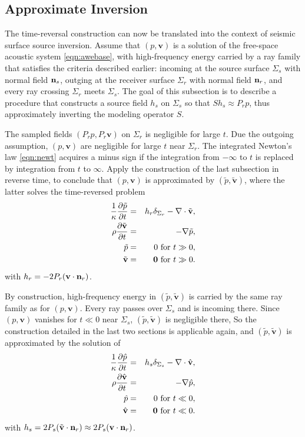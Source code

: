 \documentclass[georeport,12pt]{geophysics}
\newcommand{\bv}{\mathbf{v}}
\begin{document}
\subsection{Approximate Inversion}

The time-reversal construction can now be translated into the context
of seismic surface source inversion. Assume that $(p,\bv)$ is a
solution of the free-space acoustic system \ref{eqn:awebase}, with
high-frequency energy carried by a ray family that satisfies the
criteria described earlier: incoming at the source surface $\Sigma_s$
with normal field ${\bf n}_s$, outging at the receiver surface
$\Sigma_r$ with normal field ${\bf n}_r$, and every ray crossing
$\Sigma_r$ meets $\Sigma_s$. The goal of this subsection is to
describe a procedure that constructs a source field $h_s$ on
$\Sigma_s$ so that $Sh_s \approx P_rp$, thus approximately inverting
the modeling operator $S$.

The sampled fields $(P_rp,P_r\bv)$ on $\Sigma_r$
is negligible for large $t$. Due the outgoing assumption,
$(p,\bv)$ are negligible for large $t$ near $\Sigma_r$. The
integrated Newton's law \ref{eqn:newt} acquires a minus sign if the
integration from $-\infty$ to $t$ is replaced by integration from $t$
to $\infty$. Apply the construction of the last subsection in reverse
time, to conclude
that $(p,\bv)$ is approximated by $(\tilde{p},\tilde{\bv})$, where the
latter solves the time-reversed problem
\begin{eqnarray}
\label{eqn:awerec}
  \frac{1}{\kappa}\frac{\partial\tilde{p}}{\partial t} & = & h_r \delta_{\Sigma_r}
                                                      - \nabla \cdot \tilde{\bv}, \nonumber \\
  \rho\frac{\partial \tilde{\bv}}{\partial t} & = & - \nabla \tilde{p},\\
  \tilde{p} & = & 0 \mbox{ for } t\gg 0, \\
  \tilde{\bv} & = & {\bf 0} \mbox{ for } t \gg 0.       
\end{eqnarray}
with $h_r = -2P_r(\bv \cdot {\bf n}_r)$.

By construction, high-frequency energy in $(\tilde{p},\tilde{\bv})$ is
carried by the same ray family as for $(p,\bv)$. Every ray passes over
$\Sigma_s$ and is incoming there. Since $(p,\bv)$ vanishes for $t \ll
0$ near $\Sigma_s$, $(\tilde{p},\tilde{\bv})$ is negligible there,  So
the construction detailed in the last two sections is applicable
again, and $(\tilde{p},\tilde{\bv})$ is approximated by the solution
of 
\begin{eqnarray}
\label{eqn:awesrc}
  \frac{1}{\kappa}\frac{\partial\hat{p}}{\partial t} & = & h_s \delta_{\Sigma_s}
                                                      - \nabla \cdot \hat{\bv}, \nonumber \\
  \rho\frac{\partial \hat{\bv}}{\partial t} & = & - \nabla \hat{p},\\
  \hat{p} & = & 0 \mbox{ for } t\ll 0, \\
  \hat{\bv} & = & {\bf 0} \mbox{ for } t \ll 0.       
\end{eqnarray}
with $h_s = 2P_s(\tilde{\bv} \cdot {\bf n}_r) \approx 2P_s(\bv \cdot
{\bf n}_r)$.
\end{document}
